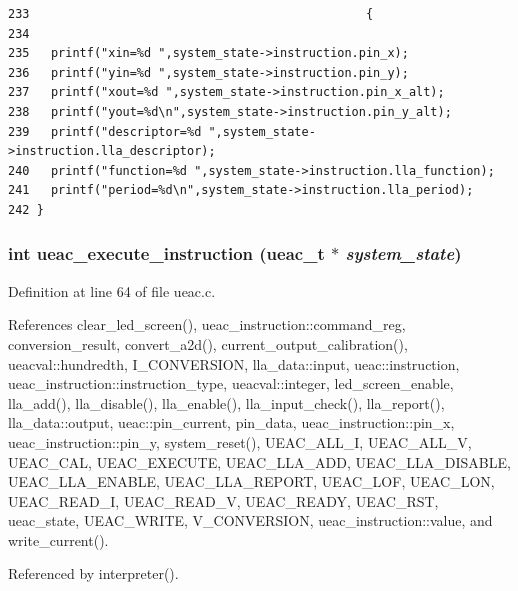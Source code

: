 \footnotesize\begin{verbatim}233                                               {
234   
235   printf("xin=%d ",system_state->instruction.pin_x);
236   printf("yin=%d ",system_state->instruction.pin_y);
237   printf("xout=%d ",system_state->instruction.pin_x_alt);
238   printf("yout=%d\n",system_state->instruction.pin_y_alt);
239   printf("descriptor=%d ",system_state->instruction.lla_descriptor);
240   printf("function=%d ",system_state->instruction.lla_function);
241   printf("period=%d\n",system_state->instruction.lla_period);
242 }
\end{verbatim}\normalsize 


\subsubsection{\setlength{\rightskip}{0pt plus 5cm}int ueac\_\-execute\_\-instruction ({\bf ueac\_\-t} $\ast$ {\em system\_\-state})}\label{ueac_8c_a3}




Definition at line 64 of file ueac.c.

References clear\_\-led\_\-screen(), ueac\_\-instruction::command\_\-reg, conversion\_\-result, convert\_\-a2d(), current\_\-output\_\-calibration(), ueacval::hundredth, I\_\-CONVERSION, lla\_\-data::input, ueac::instruction, ueac\_\-instruction::instruction\_\-type, ueacval::integer, led\_\-screen\_\-enable, lla\_\-add(), lla\_\-disable(), lla\_\-enable(), lla\_\-input\_\-check(), lla\_\-report(), lla\_\-data::output, ueac::pin\_\-current, pin\_\-data, ueac\_\-instruction::pin\_\-x, ueac\_\-instruction::pin\_\-y, system\_\-reset(), UEAC\_\-ALL\_\-I, UEAC\_\-ALL\_\-V, UEAC\_\-CAL, UEAC\_\-EXECUTE, UEAC\_\-LLA\_\-ADD, UEAC\_\-LLA\_\-DISABLE, UEAC\_\-LLA\_\-ENABLE, UEAC\_\-LLA\_\-REPORT, UEAC\_\-LOF, UEAC\_\-LON, UEAC\_\-READ\_\-I, UEAC\_\-READ\_\-V, UEAC\_\-READY, UEAC\_\-RST, ueac\_\-state, UEAC\_\-WRITE, V\_\-CONVERSION, ueac\_\-instruction::value, and write\_\-current().

Referenced by interpreter().

